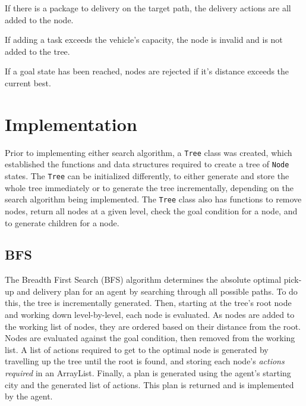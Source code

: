 \documentclass[11pt]{article}
\begin{document}
\begin{compactenum}
	\item If there is a package to delivery on the target path, the delivery actions are all added to the  node.
	\item If adding a task exceeds the vehicle's capacity, the node is invalid and is not added to the tree.
	\item If a goal state has been reached, nodes are rejected if it's distance exceeds the current best. 
\end{compactenum}


\section{Implementation}
Prior to implementing either search algorithm, a \texttt{Tree} class was created, which established the functions and data structures required to create a tree of \texttt{Node} states. The \texttt{Tree} can be initialized differently, to either generate and store the whole tree immediately or to generate the tree incrementally, depending on the search algorithm being implemented. The \texttt{Tree} class also has functions to remove nodes, return all nodes at a given level, check the goal condition for a node, and to generate children for a node. 

\subsection{BFS}
The Breadth First Search (BFS) algorithm determines the absolute optimal pick-up and delivery plan for an agent by searching through all possible paths. To do this, the tree is incrementally generated. Then, starting at the tree's root node and working down level-by-level, each node is evaluated. As nodes are added to the working list of nodes, they are ordered based on their distance from the root. Nodes are evaluated against the goal condition, then removed from the working list. A list of actions required to get to the optimal node is generated by travelling up the tree until the root is found, and storing each node's \textit{actions required} in an ArrayList. Finally, a plan is generated using the agent's starting city and the generated list of actions. This plan is returned and is implemented by the agent. 
\end{document}
